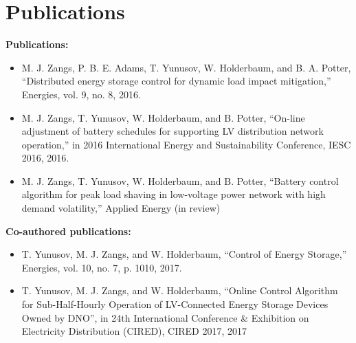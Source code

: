 \section{Publications}
\label{ch-introduction:sec:publications}

\textbf{Publications:}

\begin{itemize}
	\item M. J. Zangs, P. B. E. Adams, T. Yunusov, W. Holderbaum, and B. A. Potter, ``Distributed energy storage control for dynamic load impact mitigation,'' Energies, vol. 9, no. 8, 2016.
	\item M. J. Zangs, T. Yunusov, W. Holderbaum, and B. Potter, ``On-line adjustment of battery schedules for supporting LV distribution network operation,'' in 2016 International Energy and Sustainability Conference, IESC 2016, 2016.
	\item M. J. Zangs, T. Yunusov, W. Holderbaum, and B. Potter, ``Battery control algorithm for peak load shaving in low-voltage power network with high demand volatility,'' Applied Energy (in review)
\end{itemize}

\textbf{Co-authored publications:}

\begin{itemize}
	\item T. Yunusov, M. J. Zangs, and W. Holderbaum, ``Control of Energy Storage,'' Energies, vol. 10, no. 7, p. 1010, 2017.
	\item T. Yunusov, M. J. Zangs, and W. Holderbaum, ``Online Control Algorithm for Sub-Half-Hourly Operation of LV-Connected Energy Storage Devices Owned by DNO'', in 24th International Conference \& Exhibition on Electricity Distribution (CIRED), CIRED 2017, 2017
\end{itemize}




